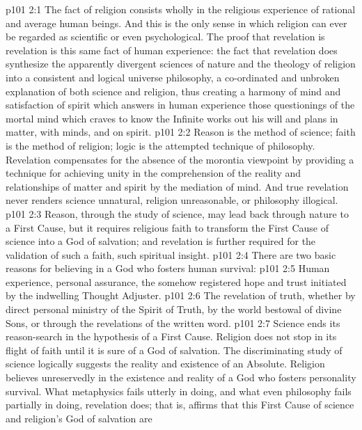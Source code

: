 \vs p101 2:1 The fact of religion consists wholly in the religious experience of rational and average human beings. And this is the only sense in which religion can ever be regarded as scientific or even psychological. The proof that revelation is revelation is this same fact of human experience: the fact that revelation does synthesize the apparently divergent sciences of nature and the theology of religion into a consistent and logical universe philosophy, a co\hyp{}ordinated and unbroken explanation of both science and religion, thus creating a harmony of mind and satisfaction of spirit which answers in human experience those questionings of the mortal mind which craves to know  the Infinite works out his will and plans in matter, with minds, and on spirit.
\vs p101 2:2 Reason is the method of science; faith is the method of religion; logic is the attempted technique of philosophy. Revelation compensates for the absence of the morontia viewpoint by providing a technique for achieving unity in the comprehension of the reality and relationships of matter and spirit by the mediation of mind. And true revelation never renders science unnatural, religion unreasonable, or philosophy illogical.
\vs p101 2:3 Reason, through the study of science, may lead back through nature to a First Cause, but it requires religious faith to transform the First Cause of science into a God of salvation; and revelation is further required for the validation of such a faith, such spiritual insight.\plusone
\vs p101 2:4 There are two basic reasons for believing in a God who fosters human survival:
\pc \vs p101 2:5 \bibnobreakspace Human experience, personal assurance, the somehow registered hope and trust initiated by the indwelling Thought Adjuster.
\vs p101 2:6 \bibnobreakspace The revelation of truth, whether by direct personal ministry of the Spirit of Truth, by the world bestowal of divine Sons, or through the revelations of the written word.
\pc \vs p101 2:7 Science ends its reason\hyp{}search in the hypothesis of a First Cause. Religion does not stop in its flight of faith until it is sure of a God of salvation. The discriminating study of science logically suggests the reality and existence of an Absolute. Religion believes unreservedly in the existence and reality of a God who fosters personality survival. What metaphysics fails utterly in doing, and what even philosophy fails partially in doing, revelation does; that is, affirms that this First Cause of science and religion’s God of salvation are 

